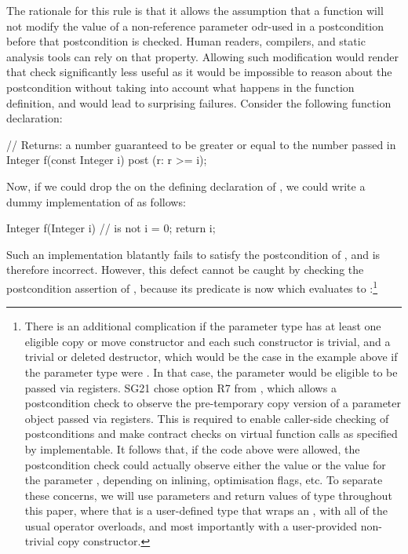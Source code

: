 The rationale for this rule is that it allows the assumption that a function will not modify the value of a non-reference parameter odr-used in a postcondition before that postcondition is checked. Human readers, compilers, and static analysis tools can rely on that property. Allowing such modification would render that check significantly less useful as it would be impossible to reason about the postcondition without taking into account what happens in the function definition, and would lead to surprising failures. Consider the following function declaration:
\begin{codeblock}
// Returns: a number guaranteed to be greater or equal to the number passed in
Integer f(const Integer i) post (r: r >= i);
\end{codeblock}
Now, if we could drop the  on the defining declaration of , we could write a dummy implementation of  as follows:
\begin{codeblock}
Integer f(Integer i) {  //  is not 
  i = 0;
  return i;
}
\end{codeblock}
Such an implementation blatantly fails to satisfy the postcondition of , and is therefore incorrect. However, this defect cannot be caught by checking the postcondition assertion of , because its predicate is now  which evaluates to :\footnote{There is an additional complication if the parameter type has at least one
eligible copy or move constructor and each such constructor is trivial, and a trivial or deleted destructor, which would be the case in the example above if the parameter type were . In that case, the parameter would be eligible to be passed via registers. SG21 chose option R7 from \cite{P3487R0}, which allows a postcondition check to observe the pre-temporary copy version of a parameter object passed via registers. This is required to enable caller-side checking of postconditions and make contract checks on virtual function calls as specified by \cite{P2900R10} implementable. It follows that, if the code above were allowed, the postcondition check could actually observe either the value  or the value  for the parameter , depending on inlining, optimisation flags, etc.   To separate these concerns, we will use parameters and return values of type  throughout this paper, where that is a user-defined type that wraps an , with all of the usual operator overloads, and most importantly with a user-provided non-trivial copy constructor.}
